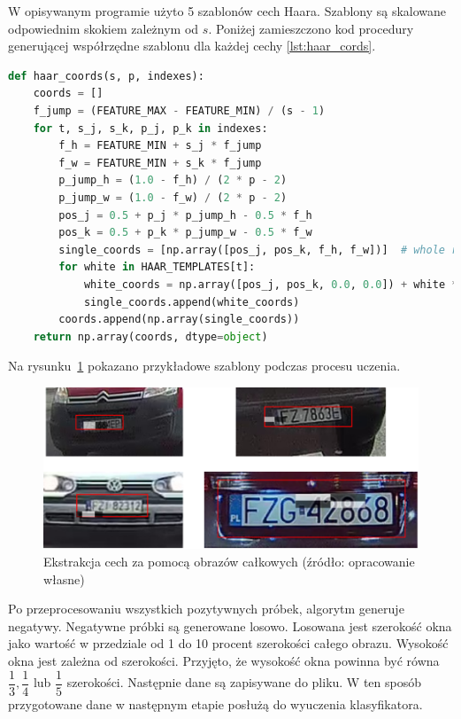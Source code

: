 W opisywanym programie użyto 5 szablonów cech Haara.
Szablony są skalowane odpowiednim skokiem zależnym od $s$.
Poniżej zamieszczono kod procedury generującej współrzędne szablonu dla każdej cechy \ref{lst:haar_cords}.
\begin{lstlisting}[language=Python, caption=Procedura generujące szablony cech Haara dla konkretnych wpsółrzędnych, label={lst:haar_cords}]
def haar_coords(s, p, indexes):
    coords = []
    f_jump = (FEATURE_MAX - FEATURE_MIN) / (s - 1)
    for t, s_j, s_k, p_j, p_k in indexes:
        f_h = FEATURE_MIN + s_j * f_jump
        f_w = FEATURE_MIN + s_k * f_jump
        p_jump_h = (1.0 - f_h) / (2 * p - 2)
        p_jump_w = (1.0 - f_w) / (2 * p - 2)
        pos_j = 0.5 + p_j * p_jump_h - 0.5 * f_h
        pos_k = 0.5 + p_k * p_jump_w - 0.5 * f_w
        single_coords = [np.array([pos_j, pos_k, f_h, f_w])]  # whole rectangle for single feature
        for white in HAAR_TEMPLATES[t]:
            white_coords = np.array([pos_j, pos_k, 0.0, 0.0]) + white * np.array([f_h, f_w, f_h, f_w])
            single_coords.append(white_coords)
        coords.append(np.array(single_coords))
    return np.array(coords, dtype=object)
\end{lstlisting}
Na rysunku~\ref{fig:haar_feats_examples} pokazano przykładowe szablony podczas procesu uczenia.
\begin{figure}[!ht]
    \centering
    \includegraphics[scale=0.6]{Pictures/haar_tepmplates}
    \caption{Ekstrakcja cech za pomocą obrazów całkowych (źródło: opracowanie własne)}
    \label{fig:haar_feats_examples}
\end{figure}
\FloatBarrier

Po przeprocesowaniu wszystkich pozytywnych próbek, algorytm generuje negatywy.
Negatywne próbki są generowane losowo.
Losowana jest szerokość okna jako wartość w przedziale od 1 do 10 procent szerokości całego obrazu.
Wysokość okna jest zależna od szerokości.
Przyjęto, że wysokość okna powinna być równa $\dfrac{1}{3}, \dfrac{1}{4}$ lub $\dfrac{1}{5}$ szerokości.
Następnie dane są zapisywane do pliku.
W ten sposób przygotowane dane w następnym etapie posłużą do wyuczenia klasyfikatora.


